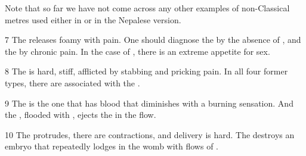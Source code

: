 Note that so far we have not come across any other examples of non-Classical metres used either in \cite{vulgate} or in the Nepalese version. 

\begin{translation}
\item [7] The  releases foamy  with pain. 
One should diagnose the  by the absence of , and the  by chronic pain.
In the case of , there is an extreme appetite for sex.

\item [8] The  is hard, stiff, afflicted by stabbing and pricking pain.
In all four former types, there are  associated with the .

\item [9] The  is the one that has blood that diminishes with a burning sensation.
And the , flooded with , ejects the  in the flow. 

\item [10] The  protrudes, there are contractions, and delivery is hard.
The  destroys an embryo that repeatedly lodges in the womb with flows of .


\end{translation}

